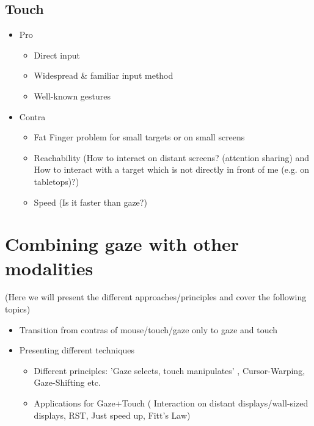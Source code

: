 \documentclass{sigchi}
\begin{document}
\subsection{Touch}
\begin{itemize}
  \item Pro
  \begin{itemize}
    \item Direct input
    \item Widespread \& familiar input method
    \item Well-known gestures
  \end{itemize}
  \item Contra
  \begin{itemize}
    \item Fat Finger problem for small targets or on small screens
    \item Reachability (How to interact on distant screens? (attention sharing) and How to interact with a target which is not directly in front of me (e.g. on tabletops)?)
    \item Speed (Is it faster than gaze?)
  \end{itemize}
 \end{itemize}

\section{Combining gaze with other modalities }
(Here we will present the different approaches/principles and cover the following topics) 

\begin{itemize}
  \item Transition from contras of mouse/touch/gaze only to gaze and touch
  \item Presenting different techniques
  \begin{itemize}
    \item Different principles: 'Gaze selects, touch manipulates' , Cursor-Warping, Gaze-Shifting etc.
    \item Applications for Gaze+Touch ( Interaction on distant displays/wall-sized displays, RST, Just speed up, Fitt’s Law)
  \end{itemize}
 \end{itemize}
\end{document}
